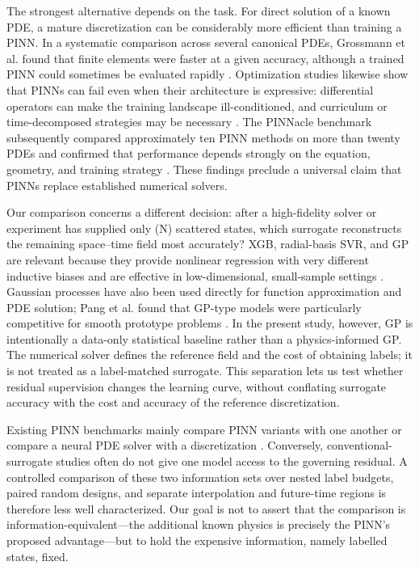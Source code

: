 The strongest alternative depends on the task. For direct solution of a known PDE, a mature discretization can be considerably more efficient than training a PINN. In a systematic comparison across several canonical PDEs, Grossmann et al. found that finite elements were faster at a given accuracy, although a trained PINN could sometimes be evaluated rapidly \cite{Grossmann2024}. Optimization studies likewise show that PINNs can fail even when their architecture is expressive: differential operators can make the training landscape ill-conditioned, and curriculum or time-decomposed strategies may be necessary \cite{Krishnapriyan2021}. The PINNacle benchmark subsequently compared approximately ten PINN methods on more than twenty PDEs and confirmed that performance depends strongly on the equation, geometry, and training strategy \cite{Hao2024}. These findings preclude a universal claim that PINNs replace established numerical solvers.

Our comparison concerns a different decision: after a high-fidelity solver or experiment has supplied only (N) scattered states, which surrogate reconstructs the remaining space--time field most accurately? XGB, radial-basis SVR, and GP are relevant because they provide nonlinear regression with very different inductive biases and are effective in low-dimensional, small-sample settings \cite{chen2016xgboost,drucker1997support,rasmussen2006gaussian}. Gaussian processes have also been used directly for function approximation and PDE solution; Pang et al. found that GP-type models were particularly competitive for smooth prototype problems \cite{Pang2019}. In the present study, however, GP is intentionally a data-only statistical baseline rather than a physics-informed GP. The numerical solver defines the reference field and the cost of obtaining labels; it is not treated as a label-matched surrogate. This separation lets us test whether residual supervision changes the learning curve, without conflating surrogate accuracy with the cost and accuracy of the reference discretization.

Existing PINN benchmarks mainly compare PINN variants with one another or compare a neural PDE solver with a discretization \cite{Grossmann2024,Hao2024}. Conversely, conventional-surrogate studies often do not give one model access to the governing residual. A controlled comparison of these two information sets over nested label budgets, paired random designs, and separate interpolation and future-time regions is therefore less well characterized. Our goal is not to assert that the comparison is information-equivalent---the additional known physics is precisely the PINN's proposed advantage---but to hold the expensive information, namely labelled states, fixed.

